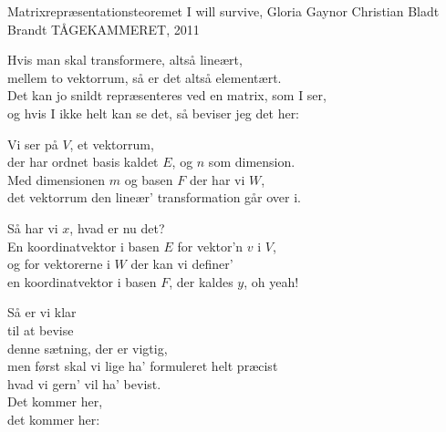 \begin{song}{Matrixrepræsentationsteoremet}
  {} %
  {I will survive, Gloria Gaynor} %
  {Christian Bladt Brandt} %
  {TÅGEKAMMERET, 2011} %
  {\NotCCLIed} %

  \begin{SBVerse}
    Hvis man skal transformere, altså lineært,\\
    mellem to vektorrum, så er det altså elementært.\\
    Det kan jo snildt repræsenteres ved en matrix, som I ser,\\
    og hvis I ikke helt kan se det, så beviser jeg det her:
  \end{SBVerse}

  \begin{SBVerse}
    Vi ser på $V$, et vektorrum,\\
    der har ordnet basis kaldet $E$, og $n$ som dimension.\\
    Med dimensionen $m$ og basen $F$ der har vi $W$,\\
    det vektorrum den lineær’ transformation går over i.
  \end{SBVerse}

  \begin{SBVerse}
    Så har vi $x$, hvad er nu det?\\
    En koordinatvektor i basen $E$ for vektor’n $v$ i $V$,\\
    og for vektorerne i $W$ der kan vi definer’\\
    en koordinatvektor i basen $F$, der kaldes $y$, oh yeah!
  \end{SBVerse}

  \begin{SBChorus}
    Så er vi klar\\
    til at bevise\\
    denne sætning, der er vigtig,\\
    men først skal vi lige ha’ formuleret helt præcist\\
    hvad vi gern’ vil ha’ bevist.\\
    Det kommer her,\\
    det kommer her:
  \end{SBChorus}


\end{song}
